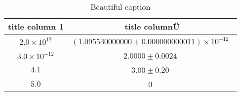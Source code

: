 \begin{table}
 \caption{Beautiful caption}
 \label{tab:important_label}
 \centering
{}
 \begin{tabular}{SS}
 \toprule 
    {title column 1}& {title columnÜ}\\ 
     \midrule
     {$2.0 \times 10^{12}$}&{$\left(1.095530000000 \pm 0.000000000011\right) \times 10^{-12}$}\ \\
     {$3.0 \times 10^{-12}$}&{$2.0000 \pm 0.0024$}\ \\
     {$4.1$}&{$3.00 \pm 0.20$}\ \\
     {$5.0$}&{$\num{0}$}\ \\
 \bottomrule
 \end{tabular}
\end{table}